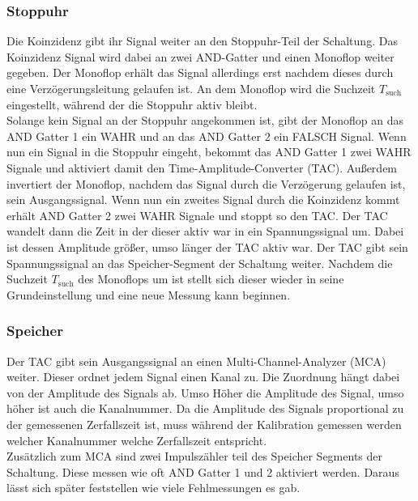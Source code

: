 \subsubsection{Stoppuhr}
Die Koinzidenz gibt ihr Signal weiter an den Stoppuhr-Teil der Schaltung.
Das Koinzidenz Signal wird dabei an zwei AND-Gatter und einen Monoflop weiter gegeben.
Der Monoflop erhält das Signal allerdings erst nachdem dieses durch eine Verzögerungsleitung gelaufen ist.
An dem Monoflop wird die Suchzeit $T_\text{such}$ eingestellt, während der die Stoppuhr aktiv bleibt.\\
Solange kein Signal an der Stoppuhr angekommen ist, gibt der Monoflop an das AND Gatter 1 ein WAHR und an das AND Gatter 2 ein FALSCH Signal.
Wenn nun ein Signal in die Stoppuhr eingeht, bekommt das AND Gatter 1 zwei WAHR Signale und aktiviert damit den Time-Amplitude-Converter (TAC).
Außerdem invertiert der Monoflop, nachdem das Signal durch die Verzögerung gelaufen ist, sein Ausgangssignal.
Wenn nun ein zweites Signal durch die Koinzidenz kommt erhält AND Gatter 2 zwei WAHR Signale und stoppt so den TAC.
Der TAC wandelt dann die Zeit in der dieser aktiv war in ein Spannungssignal um.
Dabei ist dessen Amplitude größer, umso länger der TAC aktiv war.
Der TAC gibt sein Spannungssignal an das Speicher-Segment der Schaltung weiter.
Nachdem die Suchzeit $T_\text{such}$ des Monoflops um ist stellt sich dieser wieder in seine Grundeinstellung und eine neue Messung kann beginnen.
\subsubsection{Speicher}
Der TAC gibt sein Ausgangssignal an einen Multi-Channel-Analyzer (MCA) weiter.
Dieser ordnet jedem Signal einen Kanal zu.
Die Zuordnung hängt dabei von der Amplitude des Signals ab.
Umso Höher die Amplitude des Signal, umso höher ist auch die Kanalnummer.
Da die Amplitude des Signals proportional zu der gemessenen Zerfallszeit ist, muss während der Kalibration gemessen werden welcher Kanalnummer welche Zerfallszeit entspricht.\\
Zusätzlich zum MCA sind zwei Impulszähler teil des Speicher Segments der Schaltung.
Diese messen wie oft AND Gatter 1 und 2 aktiviert werden.
Daraus lässt sich später feststellen wie viele Fehlmessungen es gab.
